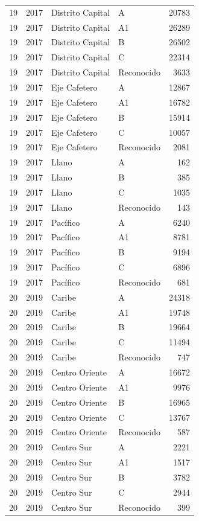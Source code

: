 \documentclass[12pt,letterpaper]{article}
\begin{document}
\begin{center}
\begin{longtable}{ccllr}
19 & 2017 & Distrito Capital & A & 20783 \\
19 & 2017 & Distrito Capital & A1 & 26289 \\
19 & 2017 & Distrito Capital & B & 26502 \\
19 & 2017 & Distrito Capital & C & 22314 \\
19 & 2017 & Distrito Capital & Reconocido & 3633 \\

19 & 2017 & Eje Cafetero & A & 12867 \\
19 & 2017 & Eje Cafetero & A1 & 16782 \\
19 & 2017 & Eje Cafetero & B & 15914 \\
19 & 2017 & Eje Cafetero & C & 10057 \\
19 & 2017 & Eje Cafetero & Reconocido & 2081 \\

19 & 2017 & Llano & A & 162 \\
19 & 2017 & Llano & B & 385 \\
19 & 2017 & Llano & C & 1035 \\
19 & 2017 & Llano & Reconocido & 143 \\

19 & 2017 & Pacífico & A & 6240 \\
19 & 2017 & Pacífico & A1 & 8781 \\
19 & 2017 & Pacífico & B & 9194 \\
19 & 2017 & Pacífico & C & 6896 \\
19 & 2017 & Pacífico & Reconocido & 681 \\

20 & 2019 & Caribe & A & 24318 \\
20 & 2019 & Caribe & A1 & 19748 \\
20 & 2019 & Caribe & B & 19664 \\
20 & 2019 & Caribe & C & 11494 \\
20 & 2019 & Caribe & Reconocido & 747 \\

20 & 2019 & Centro Oriente & A & 16672 \\
20 & 2019 & Centro Oriente & A1 & 9976 \\
20 & 2019 & Centro Oriente & B & 16965 \\
20 & 2019 & Centro Oriente & C & 13767 \\
20 & 2019 & Centro Oriente & Reconocido & 587 \\

20 & 2019 & Centro Sur & A & 2221 \\
20 & 2019 & Centro Sur & A1 & 1517 \\
20 & 2019 & Centro Sur & B & 3782 \\
20 & 2019 & Centro Sur & C & 2944 \\
20 & 2019 & Centro Sur & Reconocido & 399 \\


\end{longtable}
\end{center}
\end{document}
